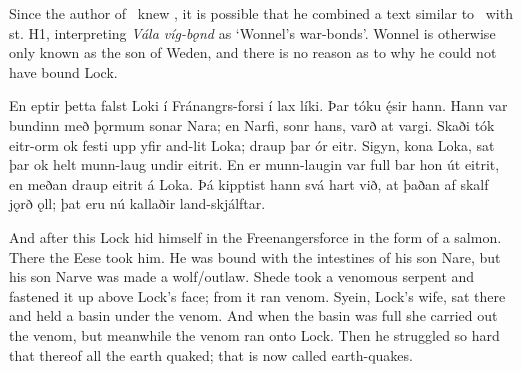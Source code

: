 Since the author of \Gylfaginning\ knew \Voluspa, it is possible that he combined a text similar to \FraLoka\ with st. H1, interpreting \emph{Vála víg-bǫnd} as ‘Wonnel’s war-bonds’. Wonnel is otherwise only known as the son of Weden, and there is no reason as to why he could not have bound Lock.

\sectionline

\bpg\bpa En eptir þetta falst Loki í Fránangrs-forsi í lax líki. Þar tóku ę́sir hann. Hann var bundinn með þǫrmum sonar Nara; en Narfi, sonr hans, varð at vargi. Skaði tók eitr-orm ok festi upp yfir and-lit Loka; draup þar ór eitr. Sigyn, kona Loka, sat þar ok helt munn-laug undir eitrit. En er munn-laugin var full bar hon út eitrit, en meðan draup eitrit á Loka. Þá kipptist hann svá hart við, at þaðan af skalf jǫrð ǫll; þat eru nú kallaðir land-skjálftar.\epa

\bpb And after this Lock hid himself in the Freenangersforce in the form of a salmon. There the Eese took him. He was bound with the intestines of his son Nare, but his son Narve was made a wolf/outlaw. Shede took a venomous serpent and fastened it up above Lock’s face; from it ran venom. Syein, Lock’s wife, sat there and held a basin under the venom. And when the basin was full she carried out the venom, but meanwhile the venom ran onto Lock. Then he struggled so hard that thereof all the earth quaked; that is now called earth-quakes.\epb\epg

\sectionline
